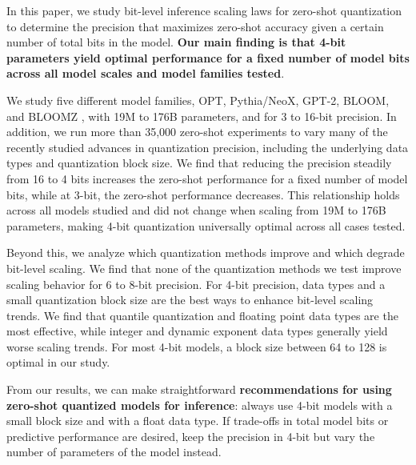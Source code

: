 In this paper, we study bit-level inference scaling laws for zero-shot quantization to determine the precision that maximizes zero-shot accuracy given a certain number of total bits in the model. {\bf Our main finding is that 4-bit parameters yield optimal performance for a fixed number of model bits across all model scales and model families tested}. 

We study five different model families, OPT, Pythia/NeoX, GPT-2, BLOOM, and BLOOMZ \citep{zhang2022opt,black2022gpt,radford2019language,scao2022bloom}, with 19M to 176B parameters, and for 3 to 16-bit precision. In addition, we run more than 35,000 zero-shot experiments to vary many of the recently studied advances in quantization precision, including the underlying data types and quantization block size. We find that reducing the precision steadily from 16 to 4 bits increases the zero-shot performance for a fixed number of model bits, while at 3-bit, the zero-shot performance decreases. This relationship holds across all models studied and did not change when scaling from 19M to 176B parameters, making 4-bit quantization universally optimal across all cases tested.

Beyond this, we analyze which quantization methods improve and which degrade bit-level scaling. We find that none of the quantization methods we test improve scaling behavior for 6 to 8-bit precision. For 4-bit precision, data types and a small quantization block size are the best ways to enhance bit-level scaling trends. We find that quantile quantization and floating point data types are the most effective, while integer and dynamic exponent data types generally yield worse scaling trends. For most 4-bit models, a block size between 64 to 128 is optimal in our study.

From our results, we can make straightforward {\bf recommendations for using zero-shot quantized models for inference}: always use 4-bit models with a small block size and with a float data type. If trade-offs in total model bits or predictive performance are desired, keep the precision in 4-bit but vary the number of parameters of the model instead.

